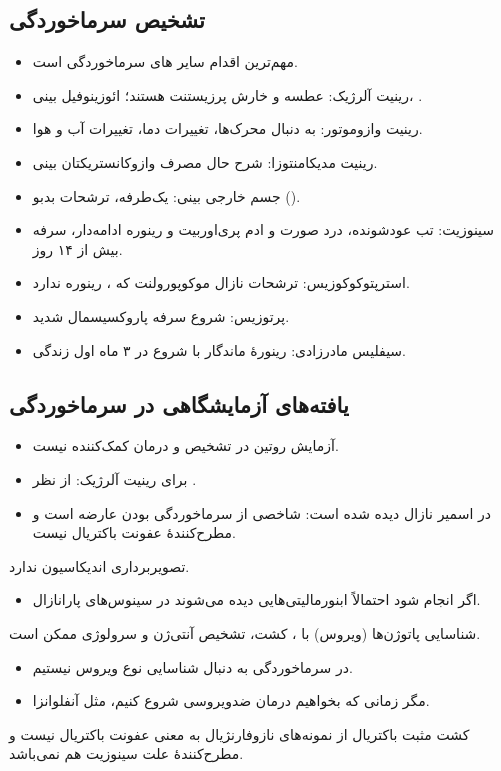 \documentclass[12pt,a4paper]{article}
\begin{document}
\subsection*{تشخیص سرماخوردگی}
\begin{itemize}
\item مهم‌ترین اقدام  سایر های سرماخوردگی است.
\item رینیت آلرژیک: عطسه و خارش پرزیستنت هستند؛ ائوزینوفیل بینی، .
\item رینیت وازوموتور: به دنبال محرک‌ها، تغییرات دما، تغییرات آب و هوا.
\item رینیت مدیکامنتوزا: شرح حال مصرف وازوکانستریکتان بینی.
\item جسم خارجی بینی: یک‌طرفه، ترشحات بدبو ().
\item سینوزیت: تب عودشونده، درد صورت و ادم پری‌اوربیت و رینوره ادامه‌دار، سرفه بیش از ۱۴ روز.
\item استرپتوکوکوزیس: ترشحات نازال موکوپورولنت که ، رینوره ندارد.
\item پرتوزیس: شروع سرفه پاروکسیسمال شدید.
\item سیفلیس مادرزادی: رینورهٔ ماندگار با شروع در ۳ ماه اول زندگی.
\end{itemize}
\subsection*{یافته‌های آزمایشگاهی در سرماخوردگی}
\begin{itemize}
\item آزمایش روتین در تشخیص و درمان کمک‌کننده نیست.
\item برای  رینیت آلرژیک:  از نظر .
\item در اسمیر نازال  دیده شده است: شاخصی از سرماخوردگی بودن عارضه است و مطرح‌کنندهٔ عفونت باکتریال نیست.
\end{itemize}

تصویربرداری اندیکاسیون ندارد.
\begin{itemize}
\item اگر انجام شود احتمالاً ابنورمالیتی‌هایی دیده می‌شوند در سینوس‌های پارانازال.
\end{itemize}
شناسایی پاتوژن‌ها (ویروس) با ، کشت، تشخیص آنتی‌ژن و سرولوژی ممکن است.
\begin{itemize}
\item در سرماخوردگی به دنبال شناسایی نوع ویروس نیستیم.
\item مگر زمانی که بخواهیم درمان ضدویروسی شروع کنیم، مثل آنفلوانزا.
\end{itemize}
کشت مثبت باکتریال از نمونه‌های نازوفارنژیال به معنی عفونت باکتریال نیست و مطرح‌کنندهٔ علت سینوزیت هم نمی‌باشد.
\end{document}
